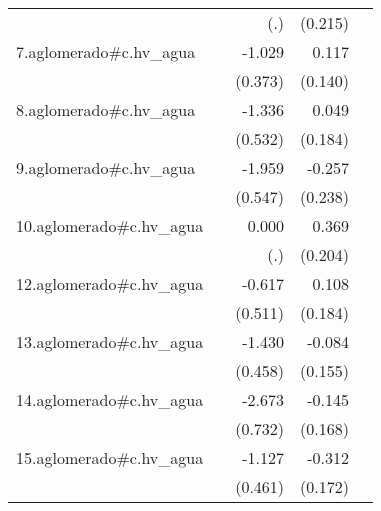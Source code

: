 {\begin{longtable}{l*{4}{D{.}{.}{-1}}}
            &                     &         (.)         &     (0.215)         &                     \\
\addlinespace
7.aglomerado#c.hv\_agua&                     &      -1.029\sym{**} &       0.117         &                     \\
            &                     &     (0.373)         &     (0.140)         &                     \\
\addlinespace
8.aglomerado#c.hv\_agua&                     &      -1.336\sym{*}  &       0.049         &                     \\
            &                     &     (0.532)         &     (0.184)         &                     \\
\addlinespace
9.aglomerado#c.hv\_agua&                     &      -1.959\sym{***}&      -0.257         &                     \\
            &                     &     (0.547)         &     (0.238)         &                     \\
\addlinespace
10.aglomerado#c.hv\_agua&                     &       0.000         &       0.369         &                     \\
            &                     &         (.)         &     (0.204)         &                     \\
\addlinespace
12.aglomerado#c.hv\_agua&                     &      -0.617         &       0.108         &                     \\
            &                     &     (0.511)         &     (0.184)         &                     \\
\addlinespace
13.aglomerado#c.hv\_agua&                     &      -1.430\sym{**} &      -0.084         &                     \\
            &                     &     (0.458)         &     (0.155)         &                     \\
\addlinespace
14.aglomerado#c.hv\_agua&                     &      -2.673\sym{***}&      -0.145         &                     \\
            &                     &     (0.732)         &     (0.168)         &                     \\
\addlinespace
15.aglomerado#c.hv\_agua&                     &      -1.127\sym{*}  &      -0.312         &                     \\
            &                     &     (0.461)         &     (0.172)         &                     \\

\end{longtable}}
